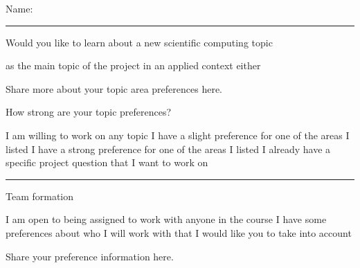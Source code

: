 \documentclass[12pt,letterpaper,noanswers]{exam}
\begin{document}
 \pdfpageheight 11in 
  \pdfpagewidth 8.5in

\noindent Name: \rule{2.5in}{0.5pt}
\vspace{2mm}

\noindent Would you like to learn about a new scientific computing topic
\begin{checkboxes}
\itemsep0pt
 \choice as the main topic of the project
 \choice in an applied context
 \choice either
\end{checkboxes}


\noindent Share more about your topic area preferences here.

\vspace{1.7in}

\noindent How strong are your topic preferences?
\begin{checkboxes}
\itemsep0pt
 \choice I am willing to work on any topic 
 \choice I have a slight preference for one of the areas I listed
 \choice I have a strong preference for one of the areas I listed
 \choice I already have a specific project question that I want to work on
\end{checkboxes}

\vspace{0.2cm}

\hrule
\vspace{0.2cm}










\noindent Team formation

\begin{checkboxes}
\itemsep0pt
 \choice I am open to being assigned to work with anyone in the course
 \choice I have some preferences about who I will work with that I would like you to take into account
\end{checkboxes}

\vspace{0.2cm}

\noindent Share your preference information here.  
\vfill
\end{document}
